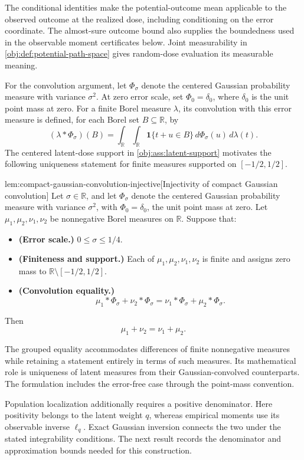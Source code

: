 The conditional identities make the potential-outcome mean applicable to the observed outcome at the realized dose, including conditioning on the error coordinate. The almost-sure outcome bound also supplies the boundedness used in the observable moment certificates below. Joint measurability in \cref{obj:def:potential-path-space} gives random-dose evaluation its measurable meaning.

For the convolution argument, let \(\Phi_\sigma\) denote the centered Gaussian probability measure with variance \(\sigma^2\). At zero error scale, set \(\Phi_0=\delta_0\), where \(\delta_0\) is the unit point mass at zero. For a finite Borel measure \(\lambda\), its convolution with this error measure is defined, for each Borel set \(B\subseteq\mathbb R\), by
\[
(\lambda*\Phi_\sigma)(B)
=
\int_{\mathbb R}\int_{\mathbb R}
\mathbf 1\{t+u\in B\}\,d\Phi_\sigma(u)\,d\lambda(t).
\]
The centered latent-dose support in \cref{obj:ass:latent-support} motivates the following uniqueness statement for finite measures supported on \([-1/2,1/2]\).

\begin{lemmav}{lem:compact-gaussian-convolution-injective}[Injectivity of compact Gaussian convolution]
Let \(\sigma\in\mathbb R\), and let \(\Phi_\sigma\) denote the centered Gaussian probability measure with variance \(\sigma^2\), with \(\Phi_0=\delta_0\), the unit point mass at zero. Let \(\mu_1,\mu_2,\nu_1,\nu_2\) be nonnegative Borel measures on \(\mathbb R\). Suppose that:
\begin{itemize}
\item \textbf{(Error scale.)} \(0\le \sigma\le 1/4\).
\item \textbf{(Finiteness and support.)} Each of \(\mu_1,\mu_2,\nu_1,\nu_2\) is finite and assigns zero mass to \(\mathbb R\setminus[-1/2,1/2]\).
\item \textbf{(Convolution equality.)}
\[
\mu_1*\Phi_\sigma+\nu_2*\Phi_\sigma
=
\nu_1*\Phi_\sigma+\mu_2*\Phi_\sigma.
\]
\end{itemize}
Then
\[
\mu_1+\nu_2=\nu_1+\mu_2.
\]
\end{lemmav}

The grouped equality accommodates differences of finite nonnegative measures while retaining a statement entirely in terms of such measures. Its mathematical role is uniqueness of latent measures from their Gaussian-convolved counterparts. The formulation includes the error-free case through the point-mass convention.

Population localization additionally requires a positive denominator. Here positivity belongs to the latent weight \(q\), whereas empirical moments use its observable inverse \(\ell_q\). Exact Gaussian inversion connects the two under the stated integrability conditions. The next result records the denominator and approximation bounds needed for this construction.

